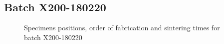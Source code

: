 \newpage
\subsection{Batch X200-180220}
\begin{figure}[h]
\centering
\noindent{}
\decoRule
\caption[Specimens positions, order of fabrication and sintering times for batch X200-180220]{Specimens positions, order of fabrication and sintering times for batch X200-180220}
\label{fig:180220-cad}
\end{figure}